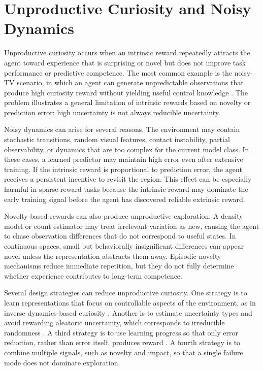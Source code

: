 \section{Unproductive Curiosity and Noisy Dynamics}
\label{sec:unproductive_curiosity_and_noisy_dynamics}

Unproductive curiosity occurs when an intrinsic reward repeatedly attracts the agent toward experience that is surprising or novel but does not improve task performance or predictive competence.
The most common example is the noisy-TV scenario, in which an agent can generate unpredictable observations that produce high curiosity reward without yielding useful control knowledge \parencite{mavor-parker-2021}.
The problem illustrates a general limitation of intrinsic rewards based on novelty or prediction error: high uncertainty is not always reducible uncertainty.

Noisy dynamics can arise for several reasons.
The environment may contain stochastic transitions, random visual features, contact instability, partial observability, or dynamics that are too complex for the current model class.
In these cases, a learned predictor may maintain high error even after extensive training.
If the intrinsic reward is proportional to prediction error, the agent receives a persistent incentive to revisit the region.
This effect can be especially harmful in sparse-reward tasks because the intrinsic reward may dominate the early training signal before the agent has discovered reliable extrinsic reward.

Novelty-based rewards can also produce unproductive exploration.
A density model or count estimator may treat irrelevant variation as new, causing the agent to chase observation differences that do not correspond to useful states.
In continuous spaces, small but behaviorally insignificant differences can appear novel unless the representation abstracts them away.
Episodic novelty mechanisms reduce immediate repetition, but they do not fully determine whether experience contributes to long-term competence.

Several design strategies can reduce unproductive curiosity.
One strategy is to learn representations that focus on controllable aspects of the environment, as in inverse-dynamics-based curiosity \parencite{pathak-2017}.
Another is to estimate uncertainty types and avoid rewarding aleatoric uncertainty, which corresponds to irreducible randomness \parencite{mavor-parker-2021}.
A third strategy is to use learning progress so that only error reduction, rather than error itself, produces reward \parencite{schmidhuber-1991,baranes-2009}.
A fourth strategy is to combine multiple signals, such as novelty and impact, so that a single failure mode does not dominate exploration.

